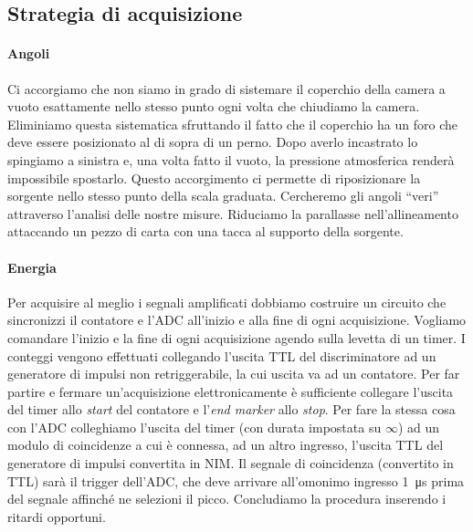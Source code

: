 \subsection{Strategia di acquisizione}

\paragraph{Angoli}
\label{spiegazione}
Ci accorgiamo che non siamo in grado di sistemare il coperchio della camera a vuoto esattamente nello stesso punto ogni volta che chiudiamo la camera. Eliminiamo questa sistematica sfruttando il fatto che il coperchio ha un foro che deve essere posizionato al di sopra di un perno. Dopo averlo incastrato lo spingiamo a sinistra e, una volta fatto il vuoto, la pressione atmosferica renderà impossibile spostarlo.
Questo accorgimento ci permette di riposizionare la sorgente nello stesso punto della scala graduata. Cercheremo gli angoli ``veri'' attraverso l'analisi delle nostre misure.
Riduciamo la parallasse nell'allineamento attaccando un pezzo di carta con una tacca al supporto della sorgente.

\paragraph{Energia}
Per acquisire al meglio i segnali amplificati dobbiamo costruire un circuito che sincronizzi il contatore e l'ADC all'inizio e alla fine di ogni acquisizione.
Vogliamo comandare l'inizio e la fine di ogni acquisizione agendo sulla levetta di un timer.
I conteggi vengono effettuati collegando l'uscita TTL del discriminatore ad un generatore di impulsi non retriggerabile, la cui uscita va ad un contatore. Per far partire e fermare un'acquisizione elettronicamente è sufficiente collegare l'uscita del timer allo \emph{start} del contatore e l'\emph{end marker} allo \emph{stop}.
Per fare la stessa cosa con l'ADC colleghiamo l'uscita del timer (con durata impostata su $\infty$) ad un modulo di coincidenze a cui è connessa, ad un altro ingresso, l'uscita TTL del generatore di impulsi convertita in NIM. Il segnale di coincidenza (convertito in TTL) sarà il trigger dell'ADC, che deve arrivare all'omonimo ingresso \SI{1}{\micro s} prima del segnale affinché ne selezioni il picco.
Concludiamo la procedura inserendo i ritardi opportuni.

